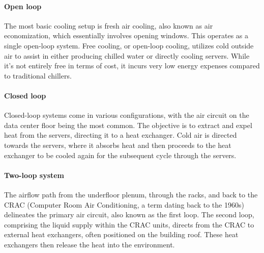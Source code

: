 \paragraph*{Open loop}
The most basic cooling setup is fresh air cooling, also known as air economization, which essentially involves opening windows. 
This operates as a single open-loop system.
Free cooling, or open-loop cooling, utilizes cold outside air to assist in either producing chilled water or directly cooling servers. 
While it's not entirely free in terms of cost, it incurs very low energy expenses compared to traditional chillers.

\paragraph*{Closed loop}
Closed-loop systems come in various configurations, with the air circuit on the data center floor being the most common.
The objective is to extract and expel heat from the servers, directing it to a heat exchanger. 
Cold air is directed towards the servers, where it absorbs heat and then proceeds to the heat exchanger to be cooled again for the subsequent cycle through the servers.

\paragraph*{Two-loop system}
The airflow path from the underfloor plenum, through the racks, and back to the CRAC (Computer Room Air Conditioning, a term dating back to the 1960s) delineates the primary air circuit, also known as the first loop.
The second loop, comprising the liquid supply within the CRAC units, directs from the CRAC to external heat exchangers, often positioned on the building roof. 
These heat exchangers then release the heat into the environment.

